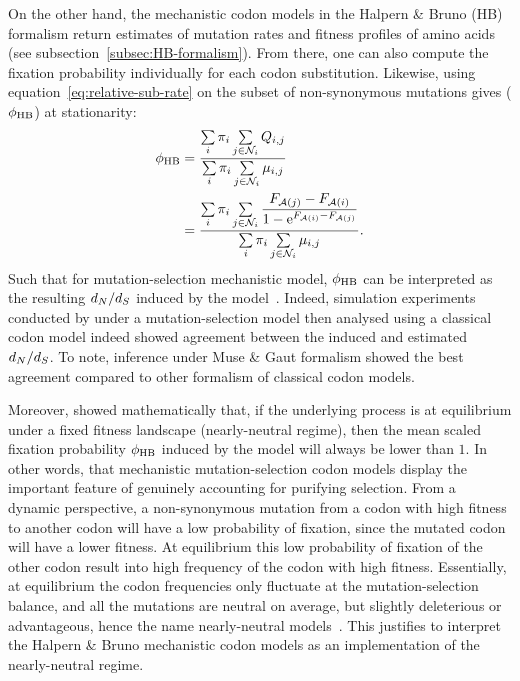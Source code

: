 On the other hand, the mechanistic codon models in the Halpern \& Bruno (HB) formalism return estimates of mutation rates and fitness profiles of amino acids (see subsection~\ref{subsec:HB-formalism}).
From there, one can also compute the fixation probability individually for each codon substitution.
Likewise, using equation~\ref{eq:relative-sub-rate} on the subset of non-synonymous mutations gives ($\phi_{\text{HB}}$) at stationarity:
\begin{align}
    \phi_{\text{HB}} & = \dfrac{ \sum\limits_{{i}} \pi_{{i}} \sum\limits_{{j} \in \mathcal{N}_{{i}}} Q_{{i}, {j}}}{\sum\limits_{{i}} \pi_{{i}} \sum\limits_{{j} \in \mathcal{N}_{{i}}} \mu_{{i}, {j}}} \\
    & = \dfrac{ \sum\limits_{i} \pi_{i} \sum\limits_{j \in \mathcal{N}_{{i}}} \dfrac{F_{\mathcal{A}({j})} - F_{\mathcal{A}({i})}}{1 - \mathrm{e}^{F_{\mathcal{A}({i})} - F_{\mathcal{A}({j})}} }}{\sum\limits_{i} \pi_{i} \sum\limits_{j \in \mathcal{N}_{{i}} } \mu_{{i}, {j}}}.
\end{align}
Such that for mutation-selection mechanistic model, $\phi_{\text{HB}}$ can be interpreted as the resulting $d_N / d_S$ induced by the model~\citep{Spielman2015,DosReis2015}.
Indeed, simulation experiments conducted by \citet{Spielman2015} under a mutation-selection model then analysed using a classical codon model indeed showed agreement between the induced and estimated $d_N / d_S$.
To note, inference under Muse \& Gaut formalism showed the best agreement compared to other formalism of classical codon models.

Moreover, \citet{Spielman2015} showed mathematically that, if the underlying process is at equilibrium under a fixed fitness landscape (nearly-neutral regime), then the mean scaled fixation probability $\phi_{\text{HB}}$ induced by the model will always be lower than $1$.
In other words, that mechanistic mutation-selection codon models display the important feature of genuinely accounting for purifying selection.
From a dynamic perspective, a non-synonymous mutation from a codon with high fitness to another codon will have a low probability of fixation, since the mutated codon will have a lower fitness.
At equilibrium this low probability of fixation of the other codon result into high frequency of the codon with high fitness.
Essentially, at equilibrium the codon frequencies only fluctuate at the mutation-selection balance, and all the mutations are neutral on average, but slightly deleterious or advantageous, hence the name nearly-neutral models~\citep{Ohta1973, Ohta1992, Rodrigue2016}.
This justifies to interpret the Halpern \& Bruno mechanistic codon models as an implementation of the nearly-neutral regime.

